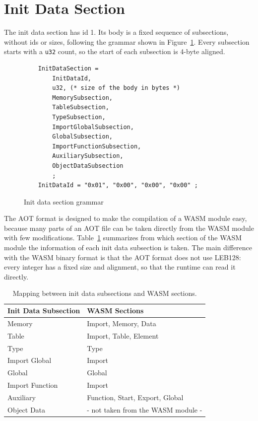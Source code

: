 \documentclass{article}
\begin{document}
\section{Init Data Section}
\label{sec:init-data}
The init data section has id 1.
Its body is a fixed sequence of subsections, without ids or sizes, following the grammar shown in Figure~\ref{fig:init-data-section-grammar}.
Every subsection starts with a \verb|u32| count, so the start of each subsection is 4-byte aligned.

\begin{figure}[H]
\begin{verbatim}
    InitDataSection =
        InitDataId,
        u32, (* size of the body in bytes *)
        MemorySubsection,
        TableSubsection,
        TypeSubsection,
        ImportGlobalSubsection,
        GlobalSubsection,
        ImportFunctionSubsection,
        AuxiliarySubsection,
        ObjectDataSubsection
        ;
    InitDataId = "0x01", "0x00", "0x00", "0x00" ;
\end{verbatim}
\caption{Init data section grammar}
\label{fig:init-data-section-grammar}
\end{figure}

The AOT format is designed to make the compilation of a WASM module easy, because many parts of an AOT file can be taken directly from the WASM module with few modifications.
Table~\ref{table:aot-subsection-wasm-section} summarizes from which section of the WASM module the information of each init data subsection is taken.
The main difference with the WASM binary format is that the AOT format does not use LEB128: every integer has a fixed size and alignment, so that the runtime can read it directly.

\begin{table}[H]
\centering
\begin{tabular}{ll}
    \hline
    Init Data Subsection & WASM Sections \\
    \hline
    Memory          & Import, Memory, Data \\
    Table           & Import, Table, Element \\
    Type            & Type \\
    Import Global   & Import \\
    Global          & Global \\
    Import Function & Import \\
    Auxiliary       & Function, Start, Export, Global \\
    Object Data     & - not taken from the WASM module - \\
    \hline
\end{tabular}
\caption{Mapping between init data subsections and WASM sections.}
\label{table:aot-subsection-wasm-section}
\end{table}
\end{document}
